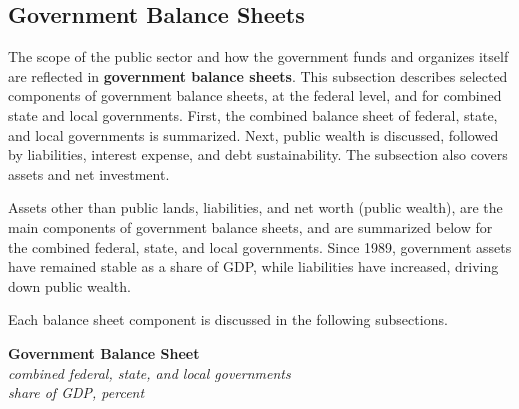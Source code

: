 \documentclass{report}
\begin{document}
{\hypertarget{govbs}{\label{govbs}}
\begin{minipage}{0.76\textwidth}
\subsection*{Government Balance Sheets}   

\small The scope of the public sector and how the government funds and organizes itself are reflected in \textbf{government balance sheets}. This subsection describes selected components of government balance sheets, at the federal level, and for combined state and local governments. First, the combined balance sheet of federal, state, and local governments is summarized. Next, public wealth is discussed, followed by liabilities, interest expense, and debt sustainability. The subsection also covers assets and net investment. 

Assets other than public lands, liabilities, and net worth (public wealth), are the main components of government balance sheets, and are summarized below for the combined federal, state, and local governments. Since 1989, government assets have remained stable as a share of GDP, while liabilities have increased, driving down public wealth. 
\end{minipage}
\vspace{0.5mm}

\begin{minipage}{0.35\textwidth}
\small  Each balance sheet component is discussed in the following subsections.
\end{minipage}\hspace{6mm}\begin{minipage}{0.37\textwidth}
\normalsize \textbf{Government Balance Sheet}\\
\footnotesize{\textit{combined federal, state, and local governments }}\\
\footnotesize{\textit{share of GDP, percent}}
\vspace{4.3cm}


\end{minipage}}
\end{document}
